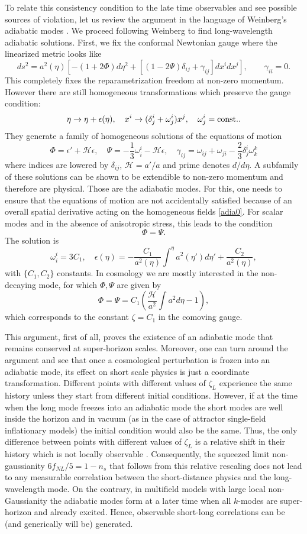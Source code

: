 \documentclass[12pt]{article}
\numberwithin{equation}{section}
\def\be{\begin{equation}}
\def\ee{\end{equation}}
\def\ep{\epsilon}
\def\cH{\mathcal{H}}
\begin{document}
To relate this consistency condition to the late time observables and see possible sources of violation, let us review the argument in the language of Weinberg's adiabatic modes \cite{Weinberg}. We proceed following Weinberg to find long-wavelength adiabatic solutions. First, we fix the conformal Newtonian gauge where the linearized metric looks like 
\be
ds^2 = a^2(\eta)[-(1+2\Phi)d\eta^2 +[(1-2\Psi)\delta_{ij}+\gamma_{ij}]dx^i dx^j],\qquad \gamma_{ii}=0.
\ee
This completely fixes the reparametrization freedom at non-zero momentum. However there are still homogeneous transformations which preserve the gauge condition:
\be
\label{diff0}
\eta\to \eta+\ep(\eta),\quad x^i\to (\delta^i_j+\omega^i_j) x^j, \quad \omega^i_j=\rm{const.}.
\ee
They generate a family of homogeneous solutions of the equations of motion
\be
\label{adia0}
\Phi = \ep'+\cH\ep,\quad \Psi =-\frac{1}{3}\omega^i_i -\cH\ep,\quad \gamma_{ij} = \omega_{ij}+\omega_{ji} - \frac{2}{3}\delta^i_j \omega^k_k
\ee
where indices are lowered by $\delta_{ij}$, $\cH=a'/a$ and prime denotes $d/d\eta$. A subfamily of these solutions can be shown to be extendible to non-zero momentum and therefore are physical. Those are the adiabatic modes. For this, one needs to ensure that the equations of motion are not accidentally satisfied because of an overall spatial derivative acting on the homogeneous fields \eqref{adia0}. For scalar modes and in the absence of anisotropic stress, this leads to the condition
\be
\label{PhiPsi}
\Phi=\Psi.
\ee
The solution is 
\be
\label{adia}
\omega^i_i=3 C_1,\quad \ep(\eta)=-\frac{C_1}{a^2(\eta)}\int^\eta a^2(\eta')d\eta' + \frac{C_2}{a^2(\eta)},
\ee
with $\{C_1,C_2\}$ constants. In cosmology we are mostly interested in the non-decaying mode, for which $\Phi,\Psi$ are given by
\be\label{diff13}
\Phi=\Psi =C_1\left(\frac{\cH}{a^2}\int a^2 d\eta-1\right),
\ee
which corresponds to the constant $\zeta = C_1$ in the comoving gauge. 

This argument, first of all, proves the existence of an adiabatic mode that remains conserved at super-horizon scales. Moreover, one can turn around the argument and see that once a cosmological perturbation is frozen into an adiabatic mode, its effect on short scale physics is just a coordinate transformation. Different points with different values of $\zeta_L$ experience the same history unless they start from different initial conditions. However, if at the time when the long mode freezes into an adiabatic mode the short modes are well inside the horizon and in vacuum (as in the case of attractor single-field inflationary models) the initial condition would also be the same. Thus, the only difference between points with different values of $\zeta_L$ is a relative shift in their history which is not locally observable \cite{Flauger}. Consequently, the squeezed limit non-gaussianity $6f_{NL}/5=1-n_s$ that follows from this relative rescaling does not lead to any measurable correlation between the short-distance physics and the long-wavelength mode. On the contrary, in multifield models with large local non-Gaussianity the adiabatic modes form at a later time when all $k$-modes are super-horizon and already excited. Hence, observable short-long correlations can be (and generically will be) generated.
\end{document}
